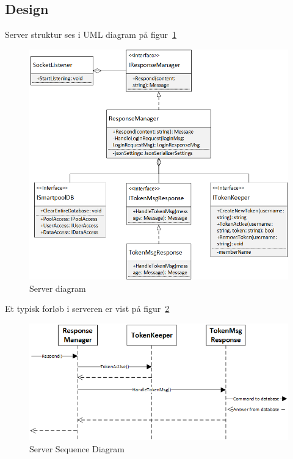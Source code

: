 \subsection{Design}
Server struktur ses i UML diagram på figur~\ref{fig:ConnectionServer}
\begin{figure}
\centering
\includegraphics[width=0.9\linewidth]{figs/connection/ConnectionServer.png}
\caption{Server diagram}
\label{fig:ConnectionServer}
\end{figure}

Et typisk forløb i serveren er vist på figur~\ref{fig:ServerSequenceResponse}
\begin{figure}
\centering
\includegraphics[width=0.9\linewidth]{figs/connection/ServerSequenceResponse.png}
\caption{Server Sequence Diagram}
\label{fig:ServerSequenceResponse}
\end{figure}


